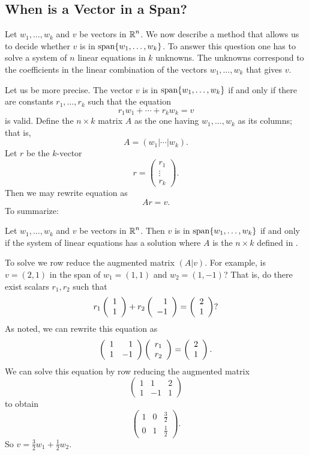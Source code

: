 \documentclass{ximera}
\begin{document}
\subsection*{When is a Vector in a Span?} 

Let $w_1,\ldots,w_k$ and $v$ be vectors in $\mbox{$\Bbb{R}$}^n$.  We now
describe a method that allows us to decide whether $v$ is in
${\rm span}\{w_1,\ldots,w_k\}$.  To answer this question one has
to solve a system of $n$ linear equations in $k$ unknowns.
The unknowns correspond to the coefficients in the linear
combination of the vectors $w_1,\ldots,w_k$ that gives $v$.

Let us be more precise.  The vector $v$ is in
${\rm span}\{w_1,\ldots,w_k\}$ if and only if there are constants
$r_1,\ldots,r_k$ such that the equation
\begin{equation}  \label{e:lindepeqn}
     r_1 w_1 + \cdots + r_k w_k = v
\end{equation}
is valid.  Define the $n\times k$ matrix $A$ as the one having
$w_1,\ldots,w_k$ as its columns; that is,
\begin{equation}  \label{E:Abycol}
A = (w_1| \cdots |w_k).
\end{equation}
Let  $r$ be the $k$-vector
\[
r= \left(\begin{array}{c} r_1 \\ \vdots \\ r_k\end{array}\right).
\]
Then we may rewrite equation  as
\begin{equation}  \label{E:Ar=v}
   Ar=v.
\end{equation}
To summarize:
\begin{lemma}
Let $w_1,\ldots,w_k$ and $v$ be vectors in $\mbox{$\Bbb{R}$}^n$.  Then $v$
is in ${\rm span}\{w_1,\ldots,w_k\}$ if and only if the system of linear
equations  has a solution where $A$ is the $n\times k$
defined in .
\end{lemma}

To solve  we row reduce the
augmented matrix $(A|v)$.
For example, is $v=(2,1)$ in the span of $w_1=(1,1)$ and $w_2=(1,-1)$?
That is, do there exist scalars $r_1,r_2$ such that
\[
r_1\left(\begin{array}{r} 1 \\ 1\end{array}\right) + r_2\left(\begin{array}{r} 1 \\ -1\end{array}\right) = \left(\begin{array}{r} 2 \\ 1\end{array}\right)?
\]
As noted, we can rewrite this equation as
\[
\left(\begin{array}{rr} 1 & 1\\ 1 &-1\end{array}\right)\left(\begin{array}{r} r_1 \\ r_2\end{array}\right) = \left(\begin{array}{r} 2 \\ 1\end{array}\right).
\]
We can solve this equation by row reducing the augmented
matrix
\[
\left(\begin{array}{rr|r}
1 & 1 & 2 \\ 1 & -1 & 1 \end{array}\right)
\]
to obtain
\[
\left(\begin{array}{rr|r}
1 & 0 & \frac{3}{2} \\ 0 & 1 & \frac{1}{2}
\end{array}\right).
\]
So $v = \frac{3}{2}w_1 + \frac{1}{2}w_2$.
\end{document}
